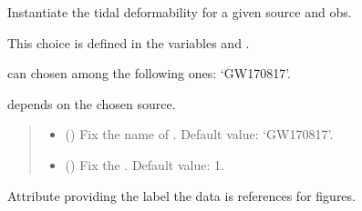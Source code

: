 \documentclass[letterpaper,10pt,english]{sphinxmanual}
\begin{document}
\begin{fulllineitems}
\label{\detokenize{source/api/setup_astro_gw:nucleardatapy.setup_astro_gw.SetupAstroGW}}
\pysigstartsignatures
\pysiglinewithargsret
{}
{\sphinxparamcomma {}}
{}
\pysigstopsignatures
\sphinxAtStartPar
Instantiate the tidal deformability for a given source and obs.

\sphinxAtStartPar
This choice is defined in the variables  and .

\sphinxAtStartPar
{} can chosen among the following ones: ‘GW170817’.

\sphinxAtStartPar
{} depends on the chosen source.
\begin{quote}\begin{description}
\begin{itemize}
\item {} 
\sphinxAtStartPar
{} (\sphinxstyleliteralemphasis{\sphinxupquote{, }}) \textendash{} Fix the name of . Default value: ‘GW170817’.

\item {} 
\sphinxAtStartPar
{} (\sphinxstyleliteralemphasis{\sphinxupquote{, }}) \textendash{} Fix the . Default value: 1.

\end{itemize}

\end{description}\end{quote}

\sphinxAtStartPar
{}

\begin{fulllineitems}
\label{\detokenize{source/api/setup_astro_gw:nucleardatapy.setup_astro_gw.SetupAstroGW.label}}
\pysigstartsignatures
\pysigline
{}
\pysigstopsignatures
\sphinxAtStartPar
Attribute providing the label the data is references for figures.


\end{fulllineitems}
\end{fulllineitems}
\end{document}
